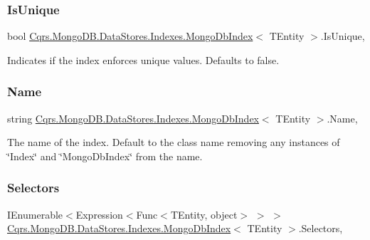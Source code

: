 \subsubsection{\texorpdfstring{Is\+Unique}{IsUnique}}
{\footnotesize\ttfamily bool \hyperlink{classCqrs_1_1MongoDB_1_1DataStores_1_1Indexes_1_1MongoDbIndex}{Cqrs.\+Mongo\+D\+B.\+Data\+Stores.\+Indexes.\+Mongo\+Db\+Index}$<$ T\+Entity $>$.Is\+Unique\hspace{0.3cm}{\ttfamily [get]}, {}}



Indicates if the index enforces unique values. Defaults to false. 

\mbox{\label{classCqrs_1_1MongoDB_1_1DataStores_1_1Indexes_1_1MongoDbIndex_af18f67df8e73bc4d9fc2239cd6d798b6}} 
\subsubsection{\texorpdfstring{Name}{Name}}
{\footnotesize\ttfamily string \hyperlink{classCqrs_1_1MongoDB_1_1DataStores_1_1Indexes_1_1MongoDbIndex}{Cqrs.\+Mongo\+D\+B.\+Data\+Stores.\+Indexes.\+Mongo\+Db\+Index}$<$ T\+Entity $>$.Name\hspace{0.3cm}{\ttfamily [get]}, {}}



The name of the index. Default to the class name removing any instances of \char`\"{}\+Index\char`\"{} and \char`\"{}\+Mongo\+Db\+Index\char`\"{} from the name. 

\mbox{\label{classCqrs_1_1MongoDB_1_1DataStores_1_1Indexes_1_1MongoDbIndex_a13bb1a8d07f1cce7c8d6ce77e3be0629}} 
\subsubsection{\texorpdfstring{Selectors}{Selectors}}
{\footnotesize\ttfamily I\+Enumerable$<$Expression$<$Func$<$T\+Entity, object$>$ $>$ $>$ \hyperlink{classCqrs_1_1MongoDB_1_1DataStores_1_1Indexes_1_1MongoDbIndex}{Cqrs.\+Mongo\+D\+B.\+Data\+Stores.\+Indexes.\+Mongo\+Db\+Index}$<$ T\+Entity $>$.Selectors\hspace{0.3cm}{\ttfamily [get]}, {}}

